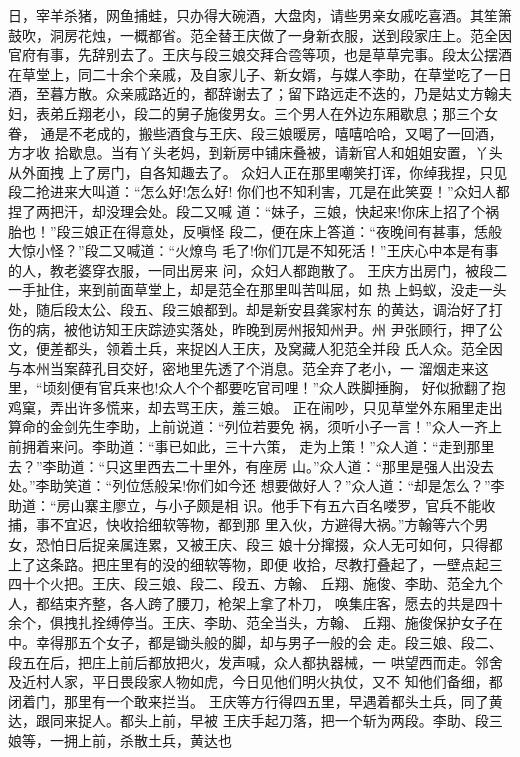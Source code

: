 日，宰羊杀猪，网鱼捕蛙，只办得大碗酒，大盘肉，请些男亲女戚吃喜酒。其笙箫
鼓吹，洞房花烛，一概都省。范全替王庆做了一身新衣服，送到段家庄上。范全因
官府有事，先辞别去了。王庆与段三娘交拜合卺等项，也是草草完事。段太公摆酒
在草堂上，同二十余个亲戚，及自家儿子、新女婿，与媒人李助，在草堂吃了一日
酒，至暮方散。众亲戚路近的，都辞谢去了；留下路远走不迭的，乃是姑丈方翰夫
妇，表弟丘翔老小，段二的舅子施俊男女。三个男人在外边东厢歇息；那三个女眷，
通是不老成的，搬些酒食与王庆、段三娘暖房，嘻嘻哈哈，又喝了一回酒，方才收
拾歇息。当有丫头老妈，到新房中铺床叠被，请新官人和姐姐安置，丫头从外面拽
上了房门，自各知趣去了。
众妇人正在那里嘲笑打诨，你绰我捏，只见段二抢进来大叫道：“怎么好!怎么好!
你们也不知利害，兀是在此笑耍！”众妇人都捏了两把汗，却没理会处。段二又喊
道：“妹子，三娘，快起来!你床上招了个祸胎也！”段三娘正在得意处，反嗔怪
段二，便在床上答道：“夜晚间有甚事，恁般大惊小怪？”段二又喊道：“火燎鸟
毛了!你们兀是不知死活！”王庆心中本是有事的人，教老婆穿衣服，一同出房来
问，众妇人都跑散了。
王庆方出房门，被段二一手扯住，来到前面草堂上，却是范全在那里叫苦叫屈，如
热上蚂蚁，没走一头处，随后段太公、段五、段三娘都到。却是新安县龚家村东
的黄达，调治好了打伤的病，被他访知王庆踪迹实落处，昨晚到房州报知州尹。州
尹张顾行，押了公文，便差都头，领着土兵，来捉凶人王庆，及窝藏人犯范全并段
氏人众。范全因与本州当案薛孔目交好，密地里先透了个消息。范全弃了老小，一
溜烟走来这里，“顷刻便有官兵来也!众人个个都要吃官司哩！”众人跌脚捶胸，
好似掀翻了抱鸡窠，弄出许多慌来，却去骂王庆，羞三娘。
正在闹吵，只见草堂外东厢里走出算命的金剑先生李助，上前说道：“列位若要免
祸，须听小子一言！”众人一齐上前拥着来问。李助道：“事已如此，三十六策，
走为上策！”众人道：“走到那里去？”李助道：“只这里西去二十里外，有座房
山。”众人道：“那里是强人出没去处。”李助笑道：“列位恁般呆!你们如今还
想要做好人？”众人道：“却是怎么？”李助道：“房山寨主廖立，与小子颇是相
识。他手下有五六百名喽罗，官兵不能收捕，事不宜迟，快收拾细软等物，都到那
里入伙，方避得大祸。”方翰等六个男女，恐怕日后捉亲属连累，又被王庆、段三
娘十分撺掇，众人无可如何，只得都上了这条路。把庄里有的没的细软等物，即便
收拾，尽教打叠起了，一壁点起三四十个火把。王庆、段三娘、段二、段五、方翰、
丘翔、施俊、李助、范全九个人，都结束齐整，各人跨了腰刀，枪架上拿了朴刀，
唤集庄客，愿去的共是四十余个，俱拽扎拴缚停当。王庆、李助、范全当头，方翰、
丘翔、施俊保护女子在中。幸得那五个女子，都是锄头般的脚，却与男子一般的会
走。段三娘、段二、段五在后，把庄上前后都放把火，发声喊，众人都执器械，一
哄望西而走。邻舍及近村人家，平日畏段家人物如虎，今日见他们明火执仗，又不
知他们备细，都闭着门，那里有一个敢来拦当。
王庆等方行得四五里，早遇着都头土兵，同了黄达，跟同来捉人。都头上前，早被
王庆手起刀落，把一个斩为两段。李助、段三娘等，一拥上前，杀散土兵，黄达也
